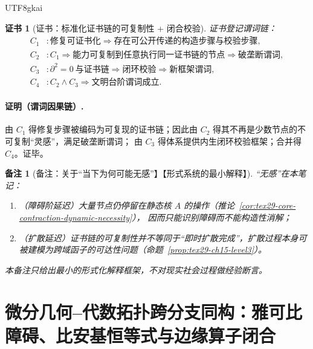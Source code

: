 \documentclass[12pt]{article}
\newtheorem{remark}{备注}[section]
\newtheorem{Certificate}{证书}[section]
\newcommand{\KouJing}{\texorpdfstring{表述约定}{表述约定}}
\begin{document}
\begin{CJK*}{UTF8}{gkai}
\begin{Certificate}[证书：标准化证书链的可复制性 + 闭合校验]
\label{cert:tex29-ch15-civilization}
证书登记谓词链：
\[
\begin{aligned}
  C_1 &: \text{修复可证书化}\Rightarrow \text{存在可公开传递的构造步骤与校验步骤},\\
  C_2 &: C_1\Rightarrow \text{能力可复制到任意执行同一证书链的节点}\Rightarrow \text{破垄断谓词},\\
  C_3 &: \partial^2=0\ \text{与证书链}\Rightarrow \text{闭环校验}\Rightarrow \text{新框架谓词},\\
  C_4 &: C_2\wedge C_3\Rightarrow \text{文明台阶谓词成立}.
\end{aligned}
\]
\end{Certificate}

\paragraph{证明（谓词因果链）.}
由 $C_1$ 得修复步骤被编码为可复现的证书链；因此由 $C_2$ 得其不再是少数节点的不可复制“灵感”，满足破垄断谓词；
由 $C_3$ 得体系提供内生闭环校验框架；合并得 $C_4$。证毕。

\begin{remark}[备注：关于“当下为何可能无感”】【形式系统的最小解释】]
“无感”在本笔记：
\begin{enumerate}
  \item （障碍阶延迟）大量节点仍停留在静态核 $A$ 的操作（推论~\ref{cor:tex29-core-contraction-dynamic-necessity}），
  因而只能识别障碍而不能构造性消解；
  \item （扩散延迟）证书链的可复制性并不等同于“即时扩散完成”，扩散过程本身可被建模为跨域函子的可达性问题（命题~\ref{prop:tex29-ch15-level3}）。
\end{enumerate}
本备注只给出最小的形式化解释框架，不对现实社会过程做经验断言。
\end{remark}

\clearpage

\section{微分几何--代数拓扑跨分支同构：雅可比障碍、比安基恒等式与边缘算子闭合}
\label{sec:tex29-ch16}


\end{CJK*}
\end{document}
